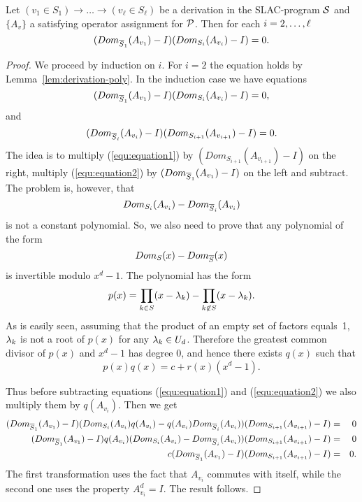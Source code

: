 \documentclass[11pt,letter]{article}
\begin{document}
\begin{lemma}\label{lem:transitive-poly}
Let $(v_1\in S_1)\to\dots\to(v_\ell\in S_\ell)$ be a derivation in the SLAC-program ${\mathcal S}$ and $\{A_v\}$ a satisfying operator assignment for ${\mathcal P}$. 
Then for each $i=2,\ldots,\ell$
\[
(Dom_{\overline S_1}(A_{v_1})-I)(Dom_{S_i}(A_{v_i})-I)=0.
\]
\end{lemma}
\begin{proof}
We proceed by induction on $i$. For $i=2$ the equation holds by 
Lemma~\ref{lem:derivation-poly}.
In the induction case we have equations
\begin{equation}\label{equ:equation1}
(Dom_{\overline S_1}(A_{v_1})-I)(Dom_{S_i}(A_{v_i})-I)=0,
\end{equation}
and 
\begin{equation}\label{equ:equation2}
(Dom_{\overline S_i}(A_{v_i})-I)(Dom_{S_{i+1}}(A_{v_{i+1}})-I)=0.
\end{equation}
The idea is to multiply (\ref{equ:equation1}) by 
$(Dom_{S_{i+1}}(A_{v_{i+1}})-I)$ on the right, multiply (\ref{equ:equation2})
by $(Dom_{\overline S_1}(A_{v_1})-I)$ on the left and subtract. The problem
is, however, that 
\[
Dom_{S_i}(A_{v_i})-Dom_{\overline S_i}(A_{v_i})
\]
is not a constant polynomial. So, we also need to prove that any polynomial
of the form 
\[
Dom_S(x)-Dom_{\overline S}(x)
\]
is invertible modulo $x^d-1$. The polynomial has the form
\[
p(x)=\prod_{k\in S}(x-\lambda_k)-\prod_{k\not\in S}(x-\lambda_k).
\]
As is easily seen, assuming that the product of an empty set of factors equals~1, $\lambda_k$ is not a
root of $p(x)$ for any $\lambda_k\in U_d$. Therefore the greatest common divisor of $p(x)$ and $x^d-1$ has degree 0, and hence there exists $q(x)$ such that 
\[
p(x)q(x)=c+r(x)(x^d-1).
\]

Thus before subtracting equations (\ref{equ:equation1}) and 
(\ref{equ:equation2}) we also multiply them by $q(A_{v_i})$. Then we get
\begin{eqnarray*}
(Dom_{\overline S_1}(A_{v_1})-I)(Dom_{S_i}(A_{v_i})q(A_{v_i})
-q(A_{v_i})Dom_{\overline S_i}(A_{v_i}))(Dom_{S_{i+1}}(A_{v_{i+1}})-I) &=& 0\\
(Dom_{\overline S_1}(A_{v_1})-I)q(A_{v_i})(Dom_{S_i}(A_{v_i})
-Dom_{\overline S_i}(A_{v_i}))(Dom_{S_{i+1}}(A_{v_{i+1}})-I) &=& 0\\
c(Dom_{\overline S_1}(A_{v_1})-I)(Dom_{S_{i+1}}(A_{v_{i+1}})-I) &=& 0.
\end{eqnarray*}
The first transformation uses the fact that $A_{v_i}$ commutes with itself, while the 
second one uses the property $A_{v_i}^d=I$.
The result follows.
\end{proof}
\end{document}
